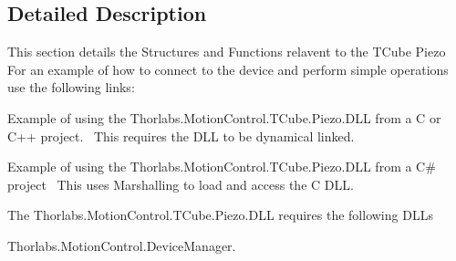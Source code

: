 

\subsection{Detailed Description}
This section details the Structures and Functions relavent to the T\+Cube Piezo~\newline
 For an example of how to connect to the device and perform simple operations use the following links\+: 
\begin{DoxyItemize}
\item Example of using the Thorlabs.Motion\+Control.T\+Cube.Piezo.D\+LL from a C or C++ project.~\newline
 This requires the D\+LL to be dynamical linked.  
\item Example of using the Thorlabs.Motion\+Control.T\+Cube.Piezo.D\+LL from a C\# project~\newline
 This uses Marshalling to load and access the C D\+LL.  
\end{DoxyItemize}The Thorlabs.\+Motion\+Control.\+T\+Cube.\+Piezo.\+D\+LL requires the following D\+L\+Ls 
\begin{DoxyItemize}
\item Thorlabs.\+Motion\+Control.\+Device\+Manager.  
\end{DoxyItemize}

